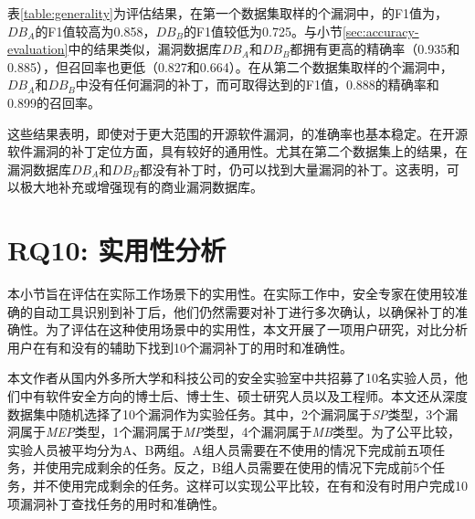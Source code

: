 表\ref{table:generality}为评估结果，在第一个数据集取样的个漏洞中，\tool 的F1值为，$DB_A$的F1值较高为0.858，$DB_B$的F1值较低为0.725。与小节\ref{sec:accuracy-evaluation}中的结果类似，漏洞数据库$DB_A$和$DB_B$都拥有更高的精确率（0.935和0.885），但召回率也更低（0.827和0.664）。在从第二个数据集取样的个漏洞中，$DB_A$和$DB_B$中没有任何漏洞的补丁，而\tool 可取得达到的F1值，0.888的精确率和0.899的召回率。

这些结果表明，即使对于更大范围的开源软件漏洞，\tool 的准确率也基本稳定。在开源软件漏洞的补丁定位方面，\tool 具有较好的通用性。尤其在第二个数据集上的结果，在漏洞数据库$DB_A$和$DB_B$都没有补丁时，\tool 仍可以找到大量漏洞的补丁。这表明，\tool 可以极大地补充或增强现有的商业漏洞数据库。



\section{RQ10: 实用性分析}\label{sec:usefulness}
本小节旨在评估\tool 在实际工作场景下的实用性。在实际工作中，安全专家在使用较准确的自动工具识别到补丁后，他们仍然需要对补丁进行多次确认，以确保补丁的准确性。为了评估\tool 在这种使用场景中的实用性，本文开展了一项用户研究，对比分析用户在有和没有\tool 的辅助下找到10个漏洞补丁的用时和准确性。

本文作者从国内外多所大学和科技公司的安全实验室中共招募了10名实验人员，他们中有软件安全方向的博士后、博士生、硕士研究人员以及工程师。本文还从深度数据集中随机选择了10个漏洞作为实验任务。其中，2个漏洞属于\textit{SP}类型，3个漏洞属于\textit{MEP}类型，1个漏洞属于\textit{MP}类型，4个漏洞属于\textit{MB}类型。为了公平比较，实验人员被平均分为A、B两组。A组人员需要在不使用\tool 的情况下完成前五项任务，并使用\tool 完成剩余的任务。反之，B组人员需要在使用\tool 的情况下完成前5个任务，并不使用\tool 完成剩余的任务。这样可以实现公平比较，在有和没有\tool 时用户完成10项漏洞补丁查找任务的用时和准确性。

